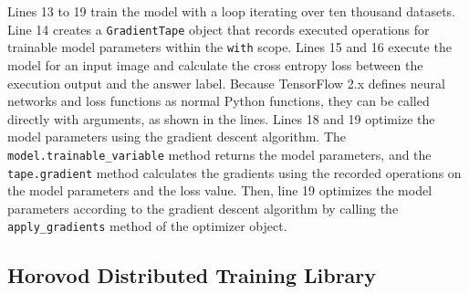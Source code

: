 Lines 13 to 19 train the model with a loop iterating over ten
thousand datasets.
Line 14 creates a {\tt GradientTape} object that records executed
operations for trainable model parameters within the {\tt with} scope.  
Lines 15 and 16 execute the model for an input image and calculate
the cross entropy loss between the execution output and the answer label. 
Because TensorFlow 2.x defines neural networks and loss functions as normal
Python functions, they can be called directly with arguments, as shown in the
lines.
Lines 18 and 19 optimize the model parameters using the gradient descent
algorithm. 
The {\tt model.trainable\_variable} method returns the model parameters, and
the {\tt tape.gradient} method calculates the gradients using the recorded
operations on the model parameters and the loss value.
Then, line 19 optimizes the model parameters according to the
gradient descent algorithm by calling the {\tt apply\_gradients} method of the
optimizer object.

\subsection{Horovod Distributed Training Library}

